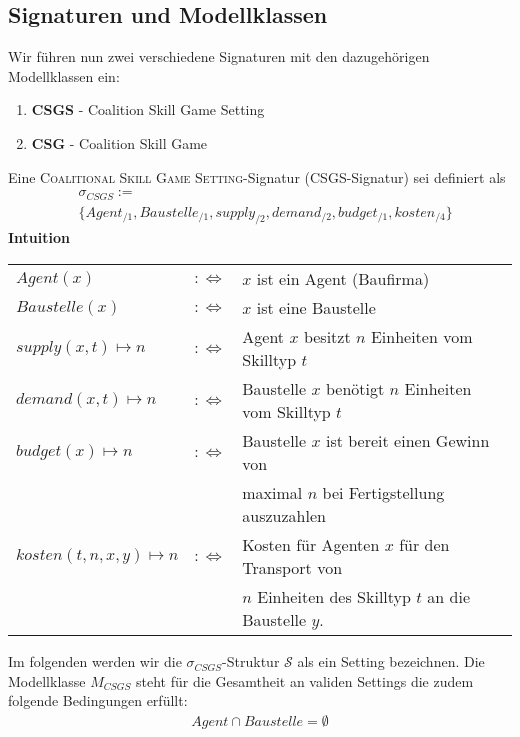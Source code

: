 \subsection{Signaturen und Modellklassen}
\label{sigandmod}
Wir führen nun zwei verschiedene Signaturen mit den dazugehörigen Modellklassen ein:
\begin{enumerate}
  \item \textbf{CSGS} - Coalition Skill Game Setting
  \item \textbf{CSG} - Coalition Skill Game
\end{enumerate}

\begin{definition}[CSGS]
  Eine \textsc{Coalitional Skill Game Setting}-Signatur (CSGS-Signatur) sei definiert als
  \begin{align*}
    &\sigma_{CSGS}:= \\
    &\{Agent_{/1}, Baustelle_{/1}, supply_{/2}, demand_{/2}, budget_{/1}, kosten_{/4} \}
  \end{align*}
  \textbf{Intuition} \\
    \begin{tabular}{lrl}
    $Agent(x)$&$:\Leftrightarrow$& $x$ ist ein Agent (Baufirma) \\
    $Baustelle(x) $&$:\Leftrightarrow$& $x$ ist eine Baustelle \\
    $supply(x, t)\mapsto n $&$:\Leftrightarrow$& Agent $x$ besitzt $n$ Einheiten vom Skilltyp $t$ \\
    $demand(x, t)\mapsto n $&$:\Leftrightarrow$& Baustelle $x$ benötigt $n$ Einheiten vom Skilltyp $t$ \\
    $budget(x)\mapsto n $&$:\Leftrightarrow$&
    Baustelle $x$ ist bereit einen Gewinn von \\&&maximal $n$ bei Fertigstellung auszuzahlen\\
    $kosten(t, n, x, y)\mapsto n$&$:\Leftrightarrow$& Kosten für Agenten $x$ für den Transport von \\&&$n$ Einheiten des Skilltyp $t$ an die Baustelle $y$.
    \end{tabular}
\end{definition}

Im folgenden werden wir die $\sigma_{CSGS}$-Struktur $\mathcal{S}$ als ein Setting bezeichnen. Die Modellklasse $M_{CSGS}$ steht für die Gesamtheit an validen Settings die zudem folgende Bedingungen erfüllt:
\begin{align}
  Agent\cap Baustelle = \emptyset
\end{align}

